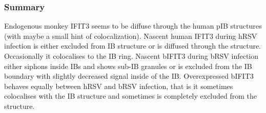 \subsubsection{Summary} \label{Summary-i3}
Endogenous monkey IFIT3 seems to be diffuse through the human pIB structures (with maybe a small hint of colocalization). Nascent human IFIT3 during hRSV infection is either excluded from IB structure or is diffused through the structure. Occasionally it colocalises to the IB ring. Nascent bIFIT3 during bRSV infection either siphons inside IBs and shows sub-IB granules or is excluded from the IB boundary with slightly decreased signal inside of the IB. Overexpressed bIFIT3 behaves equally between hRSV and bRSV infection, that is it sometimes colocalises with the IB structure and sometimes is completely excluded from the structure.